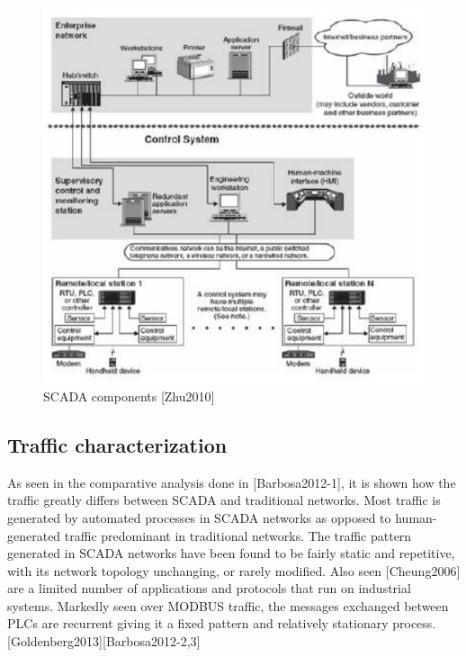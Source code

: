 \documentclass[12pt,]{article}
\begin{document}
\begin{figure}

{\centering \includegraphics{thesis_files/figure-latex/unnamed-chunk-4-1} 

}

\caption{SCADA components [Zhu2010]}\label{fig:unnamed-chunk-4}
\end{figure}

\subsection{Traffic characterization}\label{traffic-characterization}

As seen in the comparative analysis done in {[}Barbosa2012-1{]}, it is
shown how the traffic greatly differs between SCADA and traditional
networks. Most traffic is generated by automated processes in SCADA
networks as opposed to human-generated traffic predominant in
traditional networks. The traffic pattern generated in SCADA networks
have been found to be fairly static and repetitive, with its network
topology unchanging, or rarely modified. Also seen {[}Cheung2006{]} are
a limited number of applications and protocols that run on industrial
systems. Markedly seen over MODBUS traffic, the messages exchanged
between PLCs are recurrent giving it a fixed pattern and relatively
stationary process.{[}Goldenberg2013{]}{[}Barbosa2012-2,3{]}
\end{document}
